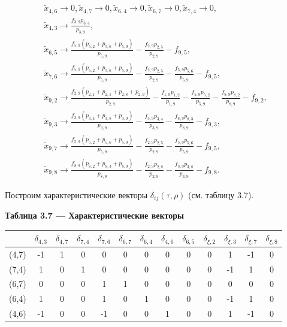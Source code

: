 \documentclass[14pt]{extarticle}%
\begin{document}
\begin{equation*}
\begin{gathered}
\tilde{x}_{4,6}\to 0,
\tilde{x}_{4,7}\to 0,
\tilde{x}_{6,4}\to 0,
\tilde{x}_{6,7}\to 0,
\tilde{x}_{7,4}\to 0,\\
\tilde{x}_{4,3}\to \frac{f_{3,9} p_{3,4}}{p_{3,9}},\\
\tilde{x}_{6,5}\to \frac{f_{5,9} \left(p_{5,2}+p_{5,6}+p_{5,9}\right)}{p_{5,9}}-\frac{f_{2,9} p_{2,5}}{p_{2,9}}-f_{9,5},\\
\tilde{x}_{7,6}\to \frac{f_{5,9} \left(p_{5,2}+p_{5,6}+p_{5,9}\right)}{p_{5,9}}-\frac{f_{2,9} p_{2,5}}{p_{2,9}}-\frac{f_{5,9} p_{5,6}}{p_{5,9}}-f_{9,5},\\
\tilde{x}_{9,2}\to \frac{f_{2,9} \left(p_{2,1}+p_{2,5}+p_{2,8}+p_{2,9}\right)}{p_{2,9}}-\frac{f_{1,9} p_{1,2}}{p_{1,9}}-\frac{f_{5,9} p_{5,2}}{p_{5,9}}-\frac{f_{8,9} p_{8,2}}{p_{8,9}}-f_{9,2},\\
\tilde{x}_{9,3}\to \frac{f_{3,9} \left(p_{3,4}+p_{3,8}+p_{3,9}\right)}{p_{3,9}}-\frac{f_{3,9} p_{3,4}}{p_{3,9}}-\frac{f_{8,9} p_{8,3}}{p_{8,9}}-f_{9,3},\\
\tilde{x}_{9,7}\to \frac{f_{5,9} \left(p_{5,2}+p_{5,6}+p_{5,9}\right)}{p_{5,9}}-\frac{f_{2,9} p_{2,5}}{p_{2,9}}-\frac{f_{5,9} p_{5,6}}{p_{5,9}}-f_{9,5},\\
\tilde{x}_{9,8}\to \frac{f_{8,9} \left(p_{8,2}+p_{8,3}+p_{8,9}\right)}{p_{8,9}}-\frac{f_{2,9} p_{2,8}}{p_{2,9}}-\frac{f_{3,9} p_{3,8}}{p_{3,9}}-f_{9,8}.
\end{gathered}
\end{equation*}

Построим характеристические векторы $\delta_{ij}(\tau,\rho)$ (см. таблицу 3.7).

\begin{center}
\textbf{Таблица 3.7 --- Характеристические векторы }\\
\begin{tabular}{c|cccccccccccc}
 & $\delta _{4,3}$ & $\delta _{4,7}$ & $\delta _{7,4}$ & $\delta _{7,6}$ & $\delta _{6,7}$ & $\delta _{6,4}$ & $\delta _{4,6}$ & $\delta _{6,5}$ & $\delta _{\xi,2}$ & $\delta _{\xi,3}$ & $\delta _{\xi,7}$ & $\delta _{\xi,8}$ \\\hline
 (4,7)& -1 & 1 & 0 & 0 & 0 & 0 & 0 & 0 & 0 & 1 & -1 & 0 \\
 (7,4)&1 & 0 & 1 & 0 & 0 & 0 & 0 & 0 & 0 & -1 & 1 & 0 \\
 (6,7)&0 & 0 & 0 & 1 & 1 & 0 & 0 & 0 & 0 & 0 & 0 & 0 \\
 (6,4)&1 & 0 & 0 & 1 & 0 & 1 & 0 & 0 & 0 & -1 & 1 & 0 \\
 (4,6)&-1 & 0 & 0 & -1 & 0 & 0 & 1 & 0 & 0 & 1 & -1 & 0 
\end{tabular}
\end{center}
\end{document}
